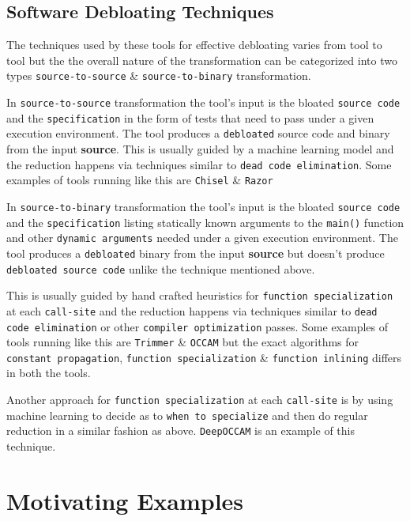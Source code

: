 \documentclass{relatorio}
\begin{document}
\subsection{Software Debloating Techniques}%

The techniques used by these tools for effective debloating varies from tool to tool but the the overall nature of the transformation can be categorized into two types \texttt{source-to-source} \& \texttt{source-to-binary} transformation. 

In \texttt{source-to-source} transformation the tool's input is the bloated \texttt{source code} and the \texttt{specification} in the form of tests that need to pass under a given execution environment. The tool produces a \texttt{debloated} source code and binary from the input \textbf{source}. This is usually guided by a machine learning model and the reduction happens via techniques similar to \texttt{dead code elimination}. Some examples of tools running like this are \texttt{Chisel} \& \texttt{Razor}
 
In \texttt{source-to-binary} transformation the tool's input is the bloated \texttt{source code} and the \texttt{specification} listing statically known arguments to the \texttt{main()} function and other \texttt{dynamic arguments} needed under a given execution environment. The tool produces a \texttt{debloated} binary from the input \textbf{source} but doesn't produce \texttt{debloated source code} unlike the technique mentioned above. 

This is usually guided by hand crafted heuristics for \texttt{function specialization} at each \texttt{call-site} and the reduction happens via techniques similar to \texttt{dead code elimination} or other \texttt{compiler optimization} passes. Some examples of tools running like this are \texttt{Trimmer} \& \texttt{OCCAM} but the exact algorithms for \texttt{constant propagation}, \texttt{function specialization} \& \texttt{function inlining} differs in both the tools. 

Another approach for \texttt{function specialization} at each \texttt{call-site} is by using machine learning to decide as to \texttt{when to specialize} and then do regular reduction in a similar fashion as above. \texttt{DeepOCCAM} is an example of this technique. 

\section{Motivating Examples}%
\end{document}
